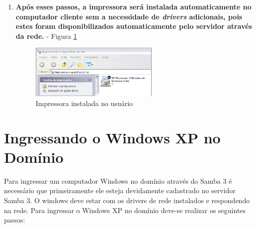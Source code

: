 \begin{enumerate}
	\item \textbf{Após esses passos, a impressora será instalada automaticamente no computador cliente sem a necessidade de \textit{drivers} adicionais, pois estes foram disponibilizados automaticamente pelo servidor através da rede.} - Figura \ref{impressora_compartilhada}
	\begin{figure}[ht]
	   	\centering
	     \includegraphics[width=0.7 \textwidth]{figuras/impressora_compartilhada}
	   	\caption{Impressora instalada no usuário}
	    \label{impressora_compartilhada}
	\end{figure}
	
\end{enumerate}


\section{Ingressando o Windows XP no Domínio}

Para ingressar um computador Windows no domínio através do Samba 3 é necessário que primeiramente ele esteja devidamente cadastrado no servidor Samba 3. O windows deve estar com os drivers de rede instalados e respondendo na rede.
Para ingressar o Windows XP no domínio deve-se realizar os seguintes passos:

